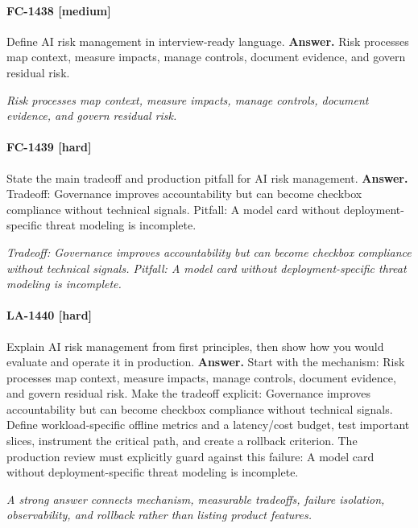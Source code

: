 \paragraph{FC-1438 [medium]} Define AI risk management in interview-ready language.
\noindent\textbf{Answer.} Risk processes map context, measure impacts, manage controls, document evidence, and govern residual risk.
\par\textit{Risk processes map context, measure impacts, manage controls, document evidence, and govern residual risk.}
\paragraph{FC-1439 [hard]} State the main tradeoff and production pitfall for AI risk management.
\noindent\textbf{Answer.} Tradeoff: Governance improves accountability but can become checkbox compliance without technical signals. Pitfall: A model card without deployment-specific threat modeling is incomplete.
\par\textit{Tradeoff: Governance improves accountability but can become checkbox compliance without technical signals. Pitfall: A model card without deployment-specific threat modeling is incomplete.}
\paragraph{LA-1440 [hard]} Explain AI risk management from first principles, then show how you would evaluate and operate it in production.
\noindent\textbf{Answer.} Start with the mechanism: Risk processes map context, measure impacts, manage controls, document evidence, and govern residual risk. Make the tradeoff explicit: Governance improves accountability but can become checkbox compliance without technical signals. Define workload-specific offline metrics and a latency/cost budget, test important slices, instrument the critical path, and create a rollback criterion. The production review must explicitly guard against this failure: A model card without deployment-specific threat modeling is incomplete.
\par\textit{A strong answer connects mechanism, measurable tradeoffs, failure isolation, observability, and rollback rather than listing product features.}
